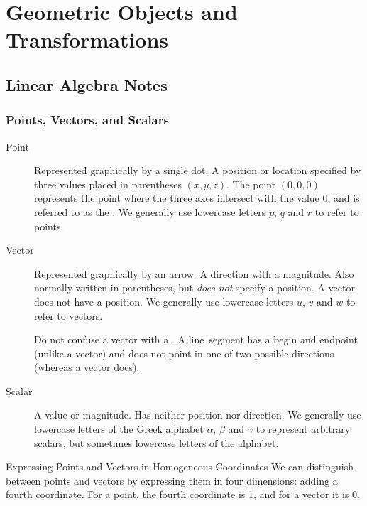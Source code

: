 \documentclass[../COS3712_Notes.tex]{subfiles}
\begin{document}
  \setcounter{chapter}{2}
  \chapter{Geometric Objects and Transformations}
    \section{Linear Algebra Notes}
      \subsection{Points, Vectors, and Scalars}
        \begin{description}
          \item[Point] Represented graphically by a single dot.
            A position or location specified by three values placed in parentheses $(x, y, z)$.
            The point $(0, 0, 0)$ represents the point where the three axes intersect
            with the value 0, and is referred to as the .
            We generally use lowercase letters $p$, $q$ and $r$ to refer to points.
          \item[Vector] Represented graphically by an arrow.
            A direction with a magnitude.
            Also normally written in parentheses, but \emph{does not} specify a position.
            A vector does not have a position.
            We generally use lowercase letters $u$, $v$ and $w$ to refer to vectors.

            Do not confuse a vector with a .
            A line~segment has a begin and endpoint (unlike a vector)
            and does not point in one of two possible directions
            (whereas a vector does).
          \item[Scalar] A value or magnitude.
            Has neither position nor direction.
            We generally use lowercase letters of the Greek alphabet $\alpha$, $\beta$ and $\gamma$
            to represent arbitrary scalars, but sometimes lowercase letters of the alphabet.
        \end{description}

        \begin{sidenote}{Expressing Points and Vectors in Homogeneous Coordinates}
          We can distinguish between points and vectors by expressing them in four dimensions:
          adding a fourth coordinate.
          For a point, the fourth coordinate is 1, and for a vector it is 0.
        \end{sidenote}
\end{document}
